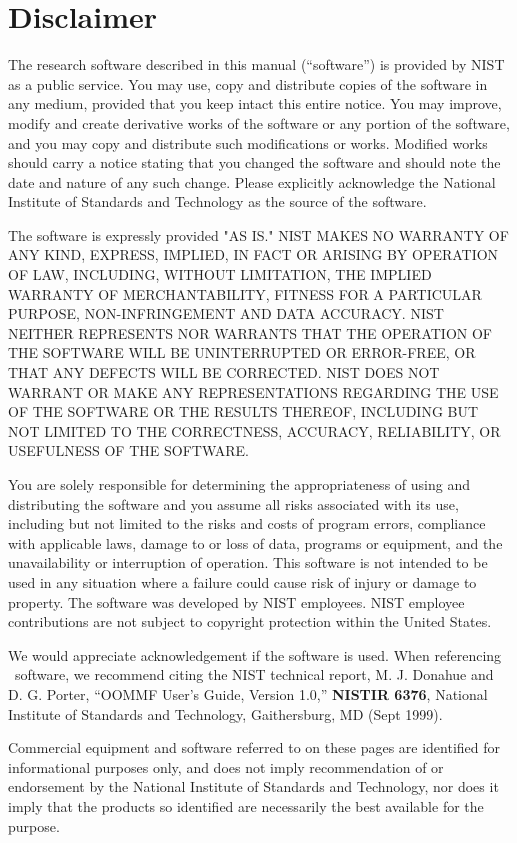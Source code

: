 \section*{Disclaimer}

The research software described in this manual (``software'') is provided
by NIST as a public service. You may use, copy and distribute copies of
the software in any medium, provided that you keep intact this entire notice.
You may improve, modify and create derivative works of the software or any
portion of the software, and you may copy and distribute such modifications
or works. Modified works should carry a notice stating that you changed the
software and should note the date and nature of any such change. Please
explicitly acknowledge the National Institute of Standards and Technology
as the source of the software.

The software is expressly provided "AS IS." NIST MAKES NO WARRANTY OF ANY
KIND, EXPRESS, IMPLIED, IN FACT OR ARISING BY OPERATION OF LAW, INCLUDING,
WITHOUT LIMITATION, THE IMPLIED WARRANTY OF MERCHANTABILITY, FITNESS FOR A
PARTICULAR PURPOSE, NON-INFRINGEMENT AND DATA ACCURACY. NIST NEITHER
REPRESENTS NOR WARRANTS THAT THE OPERATION OF THE SOFTWARE WILL BE
UNINTERRUPTED OR ERROR-FREE, OR THAT ANY DEFECTS WILL BE CORRECTED. NIST
DOES NOT WARRANT OR MAKE ANY REPRESENTATIONS REGARDING THE USE OF THE
SOFTWARE OR THE RESULTS THEREOF, INCLUDING BUT NOT LIMITED TO THE
CORRECTNESS, ACCURACY, RELIABILITY, OR USEFULNESS OF THE SOFTWARE. 

You are solely responsible for determining the appropriateness of using
and distributing the software and you assume all risks associated with
its use, including but not limited to the risks and costs of program errors,
compliance with applicable laws, damage to or loss of data, programs or
equipment, and the unavailability or interruption of operation. This
software is not intended to be used in any situation where a failure
could cause risk of injury or damage to property.  The software was
developed by NIST employees. NIST employee contributions are not subject
to copyright protection within the United States. 

We would appreciate acknowledgement if the software is used.  When
referencing \OOMMF\ software, we recommend citing the NIST technical
report, M. J. Donahue and D. G. Porter, ``OOMMF User's Guide, Version
1.0,'' \textbf{NISTIR 6376}, National Institute of Standards and
Technology, Gaithersburg, MD (Sept 1999).

Commercial equipment and software referred to on these pages are
identified for informational purposes only, and does not imply
recommendation of or endorsement by the National Institute of Standards
and Technology, nor does it imply that the products so identified are
necessarily the best available for the purpose.
